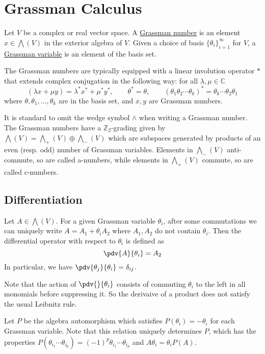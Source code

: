 \chapter{Grassman Calculus} 
\label{appendix2}
\begin{defn}
	Let $V$ be a complex or real vector space.
	A \underline{Grassman number} is an element $x\in
	\bigwedge(V)$ in the exterior algebra of $V$.
	Given a choice of basis $\{\theta_i\}_{i=1}^{\infty}$ for $V$, a
	\underline{Grassman variable} is an element of the basis set.

	The Grassman numbers are typically equipped with a linear involution operator
	$*$ that extends complex conjugation in the following way: for all
	$\lambda,\mu\in\mathbb{C}$	
	\[
	(\lambda x + \mu y) = \lambda^* x^* + \mu^*y^*,	\qquad
	\theta^* = \theta, \qquad
	(\theta_1\theta_2\cdots\theta_k)^*=\theta_k\cdots\theta_2\theta_1
	\] 
	where $\theta,\theta_1,\ldots,\theta_k$ are in the basis set, and $x,y$ are
	Grassman numbers.
\end{defn}

It is standard to omit the wedge symbol $\wedge$ when writing a Grassman number.
The Grassman numbers have a $\mathbb{Z}_2$-grading given by $\bigwedge(V) =
\bigwedge_+(V) \oplus \bigwedge_-(V)$ which are subspaces generated by products
of an even (resp. odd) number of Grassman variables. Elements in
$\bigwedge_-(V)$ anti-commute, so are called a-numbers, while elements in 
$\bigwedge_+(V)$ commute, so are called c-numbers.

\section{Differentiation}
Let $A\in \bigwedge(V)$. For a given Grassman variable  $\theta_i$, after some
commutations we can uniquely write $A = A_1 + \theta_iA_2$ where $A_1,A_2$ do not
contain $\theta_i$. Then the differential operator with respect to $\theta_i$ is
defined as
\[
\pdv{A}{\theta_i} = A_2
\] 
In particular, we have $\pdv{\theta_j}{\theta_i} = \delta_{ij}$.

Note that the action of $\pdv{}{\theta_i}$ consists of commuting $\theta_i$ to
the left in all monomials before suppressing it. So the
derivaive of a product does not satisfy the usual Leibnitz rule.

Let $P$ be the algebra automorphism which satisfies $P(\theta_i)=-\theta_i$ for
each Grassman variable. Note that this relation uniquely determines  $P$,
which has the properties
$P(\theta_{i_1}\cdots\theta_{i_p})=(-1)^p\theta_{i_1}\cdots\theta_{i_p}$ and  
$A\theta_i = \theta_iP(A)$.

